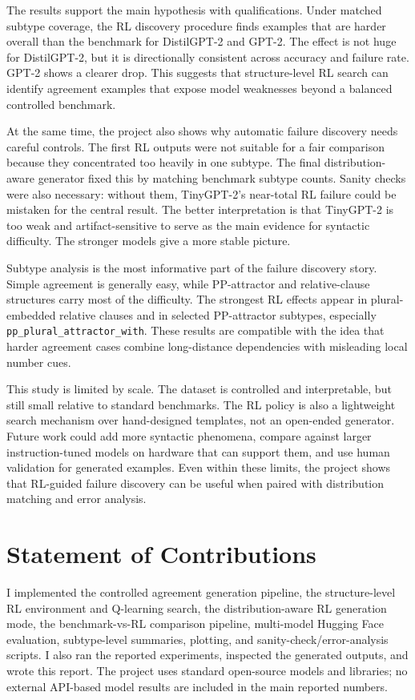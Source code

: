 \documentclass[11pt]{article}
\begin{document}
The results support the main hypothesis with qualifications. Under matched
subtype coverage, the RL discovery procedure finds examples that are harder
overall than the benchmark for DistilGPT-2 and GPT-2. The effect is not huge
for DistilGPT-2, but it is directionally consistent across accuracy and
failure rate. GPT-2 shows a clearer drop. This suggests that structure-level
RL search can identify agreement examples that expose model weaknesses beyond
a balanced controlled benchmark.

At the same time, the project also shows why automatic failure discovery needs
careful controls. The first RL outputs were not suitable for a fair comparison
because they concentrated too heavily in one subtype. The final
distribution-aware generator fixed this by matching benchmark subtype counts.
Sanity checks were also necessary: without them, TinyGPT-2's near-total RL
failure could be mistaken for the central result. The better interpretation is
that TinyGPT-2 is too weak and artifact-sensitive to serve as the main evidence
for syntactic difficulty. The stronger models give a more stable picture.

Subtype analysis is the most informative part of the failure discovery story. Simple
agreement is generally easy, while PP-attractor and relative-clause structures
carry most of the difficulty. The strongest RL effects appear in
plural-embedded relative clauses and in selected PP-attractor subtypes,
especially \texttt{pp\_plural\_attractor\_with}. These results are compatible
with the idea that harder agreement cases combine long-distance dependencies
with misleading local number cues.

This study is limited by scale. The dataset is controlled and interpretable,
but still small relative to standard benchmarks. The RL policy is also a
lightweight search mechanism over hand-designed templates, not an open-ended
generator. Future work could add more syntactic phenomena, compare against
larger instruction-tuned models on hardware that can support them, and use
human validation for generated examples. Even within these limits, the project
shows that RL-guided failure discovery can be useful when paired with distribution
matching and error analysis.

\section*{Statement of Contributions}

I implemented the controlled agreement generation pipeline, the structure-level
RL environment and Q-learning search, the distribution-aware RL generation
mode, the benchmark-vs-RL comparison pipeline, multi-model Hugging Face
evaluation, subtype-level summaries, plotting, and sanity-check/error-analysis
scripts. I also ran the reported experiments, inspected the generated outputs,
and wrote this report. The project uses standard open-source models and
libraries; no external API-based model results are included in the main
reported numbers.


\end{document}
